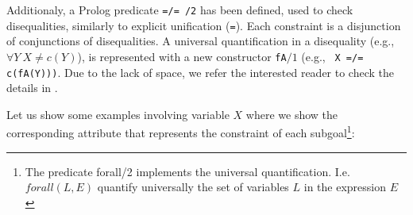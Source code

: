 \documentclass{tlp}
\begin{document}







Additionaly, a Prolog predicate {\tt =/= /2} has been defined, used to
check disequalities, similarly to explicit unification ({\tt =}). Each
constraint is a disjunction of conjunctions of disequalities. A
universal quantification in a disequality (e.g., $\forall Y~ X \neq
c(Y)$), is represented with a new constructor {\tt fA}$/1$ (e.g., {\tt
X =/= c(fA(Y)))}.  Due to the lack of space, we refer the interested
reader to check the details in \cite{SusanaPADL2000}.


Let us show some examples involving variable $X$ where we show the
corresponding attribute that represents the constraint of each
subgoal\footnote{The predicate forall/2 implements the universal
quantification. I.e. $forall(L,E)$ quantify universally the set of variables
$L$ in the expression $E$}: 
\end{document}
